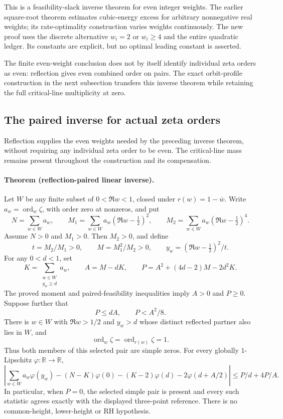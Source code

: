 This is a feasibility-slack inverse theorem for even integer weights.
The earlier square-root theorem estimates cubic-energy excess for arbitrary
nonnegative real weights; its rate-optimality construction varies weights
continuously.  The new proof uses the discrete alternative \(w_i=2\) or
\(w_i\ge4\) and the entire quadratic ledger.
Its constants are explicit, but no optimal leading constant is asserted.

The finite even-weight conclusion does not by itself identify individual
zeta orders as even: reflection gives even combined order on pairs.
The exact orbit-profile construction in the next subsection transfers this
inverse theorem while retaining the full critical-line multiplicity at zero.

\subsection{The paired inverse for actual zeta orders}
\label{subsec:paired-threshold-feasibility-stability}

Reflection supplies the even weights needed by the preceding inverse theorem,
without requiring any individual zeta order to be even.  The critical-line
mass remains present throughout the construction and its compensation.

\paragraph{Theorem (reflection-paired linear inverse).}
Let \(W\) be any finite subset of \(0<\Re w<1\), closed under
\(r(w)=1-\overline w\).  Write \(a_w=\operatorname{ord}_w\zeta\), with
order zero at nonzeros, and put
\[
 N=\sum_{w\in W}a_w,\qquad
 M_1=\sum_{w\in W}a_w(\Re w-\tfrac12)^2,\qquad
 M_2=\sum_{w\in W}a_w(\Re w-\tfrac12)^4.
\]
Assume \(N>0\) and \(M_1>0\).  Then \(M_2>0\), and define
\[
 t=M_2/M_1>0,\qquad M=M_1^2/M_2>0,\qquad
 y_w=(\Re w-\tfrac12)^2/t.
\]
For any \(0<d<1\), set
\[
 K=\sum_{\substack{w\in W\\y_w\ge d}}a_w,\qquad
 A=M-dK,\qquad P=A^2+(4d-2)M-2d^2K.
\]
The proved moment and paired-feasibility inequalities imply \(A>0\)
and \(P\ge0\).  Suppose further that
\[
 P\le dA,\qquad P<A^2/8.
\]
There is \(w\in W\) with \(\Re w>1/2\) and \(y_w>d\) whose distinct
reflected partner also lies in \(W\), and
\[
 \operatorname{ord}_w\zeta=\operatorname{ord}_{r(w)}\zeta=1.
\]
Thus both members of this selected pair are simple zeros.
For every globally \(1\)-Lipschitz \(\varphi:\mathbb R\to\mathbb R\),
\[
 \left|\sum_{w\in W}a_w\varphi(y_w)
 -(N-K)\varphi(0)-(K-2)\varphi(d)
 -2\varphi(d+A/2)\right|
 \le P/d+4P/A.
\]
In particular, when \(P=0\), the selected simple pair is present and every
such statistic agrees exactly with the displayed three-point reference.
There is no common-height, lower-height or RH hypothesis.

